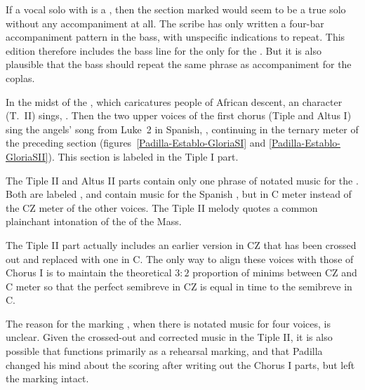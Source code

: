 If a vocal solo with  is a , then the section marked 
 would seem to be a true solo without any accompaniment 
at all.
The scribe has only written a four-bar accompaniment pattern in the bass, with 
unspecific indications to repeat.
This edition therefore includes the bass line for the  only 
for the .
But it is also plausible that the bass should repeat the same phrase as 
accompaniment for the coplas.


In the midst of the , which caricatures people of African
descent, an  character (T.~II) sings, .
Then the two upper voices of the first chorus (Tiple and Altus I) sing the 
angels' song from Luke~2 in Spanish, , continuing in the ternary meter of the preceding section
(figures~\ref{Padilla-Establo-GloriaSI} and \ref{Padilla-Establo-GloriaSII}).
This section is labeled  in the Tiple I part.

The Tiple II and Altus II parts contain only one phrase of notated music for 
the .
Both are labeled , and contain music for the 
Spanish , but in C meter instead of the CZ meter of the other 
voices.
The Tiple II melody quotes a common plainchant intonation of 
the  of the Mass.

The Tiple II part actually includes an earlier version in CZ that has been 
crossed out and replaced with one in C.
The only way to align these voices with those of Chorus I is to maintain the 
theoretical $3:2$ proportion of minims between CZ and C meter so that the 
perfect semibreve in CZ is equal in time to the semibreve in C.

The reason for the marking , when there is notated music for four 
voices, is unclear.
Given the crossed-out and corrected music in the Tiple II, it is also possible 
that  functions primarily as a rehearsal marking, and that Padilla 
changed his mind about the scoring after writing out the Chorus I parts, but 
left the marking intact.


